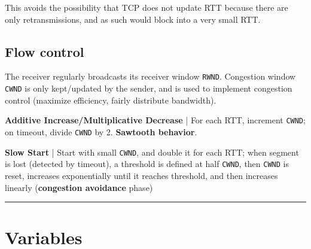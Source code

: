 \documentclass{form}
\begin{document}
\begin{minipage}[c]{0.39\textwidth}
    This avoids the possibility that TCP does not update RTT because there are only retransmissions, and as such would block into a very small RTT.

    \subsection*{Flow control}

    The receiver regularly broadcasts its receiver window \texttt{RWND}.
    Congestion window \texttt{CWND} is only kept/updated by the sender, and is used to implement congestion control (maximize efficiency, fairly distribute bandwidth).

    \textbf{Additive Increase/Multiplicative Decrease} |
    For each RTT, increment \texttt{CWND}; on timeout, divide \texttt{CWND} by 2. \textbf{Sawtooth behavior}.

    \textbf{Slow Start} | 
    Start with small \texttt{CWND}, and double it for each RTT; when segment is lost (detected by timeout), a threshold is defined at half \texttt{CWND}, then \texttt{CWND} is reset, increases exponentially until it reaches threshold, and then increases linearly (\textbf{congestion avoidance} phase)
\end{minipage}

\noindent\rule{\textwidth}{1.0pt}\vspace{-1em}

\section*{Variables}
\end{document}
